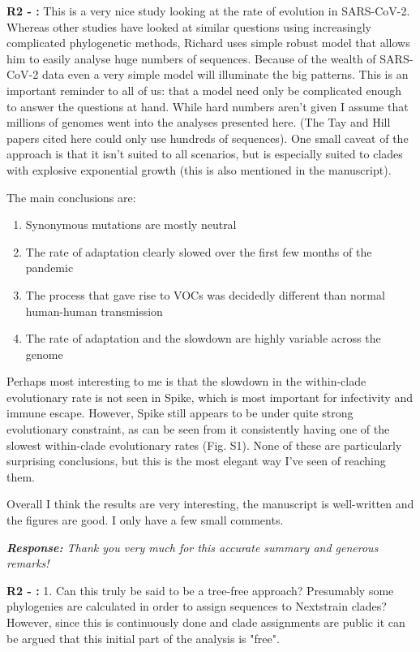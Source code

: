 \documentclass[aps,rmp,onecolumn]{revtex4-1}
\newcounter{counter1}[section]
\newcounter{counter2}[section]
\newcounter{counter3}[section]
\newcommand{\refb}[1]{\vskip 5mm \textbf{R2 - \stepcounter{counter2}\arabic{counter2}:} #1}
\newcommand{\response}[1]{{\it {\color{response}\textbf{Response:} #1}}\vskip 5mm}
\begin{document}
\refb{
This is a very nice study looking at the rate of evolution in SARS-CoV-2. Whereas other studies have looked at similar questions using increasingly complicated phylogenetic methods, Richard uses simple robust model that allows him to easily analyse huge numbers of sequences. Because of the wealth of SARS-CoV-2 data even a very simple model will illuminate the big patterns. This is an important reminder to all of us: that a model need only be complicated enough to answer the questions at hand. While hard numbers aren't given I assume that millions of genomes went into the analyses presented here. (The Tay and Hill papers cited here could only use hundreds of sequences). One small caveat of the approach is that it isn't suited to all scenarios, but is especially suited to clades with explosive exponential growth (this is also mentioned in the manuscript).

The main conclusions are:
\begin{enumerate}
 \item Synonymous mutations are mostly neutral
 \item The rate of adaptation clearly slowed over the first few months of the pandemic
 \item The process that gave rise to VOCs was decidedly different than normal human-human transmission
 \item The rate of adaptation and the slowdown are highly variable across the genome
\end{enumerate}
Perhaps most interesting to me is that the slowdown in the within-clade evolutionary rate is not seen in Spike, which is most important for infectivity and immune escape. However, Spike still appears to be under quite strong evolutionary constraint, as can be seen from it consistently having one of the slowest within-clade evolutionary rates (Fig. S1). None of these are particularly surprising conclusions, but this is the most elegant way I've seen of reaching them.

Overall I think the results are very interesting, the manuscript is well-written and the figures are good. I only have a few small comments.}

\response{Thank you very much for this accurate summary and generous remarks!}

\refb{1. Can this truly be said to be a tree-free approach? Presumably some phylogenies are calculated in order to assign sequences to Nextstrain clades? However, since this is continuously done and clade assignments are public it can be argued that this initial part of the analysis is "free".}
\end{document}
